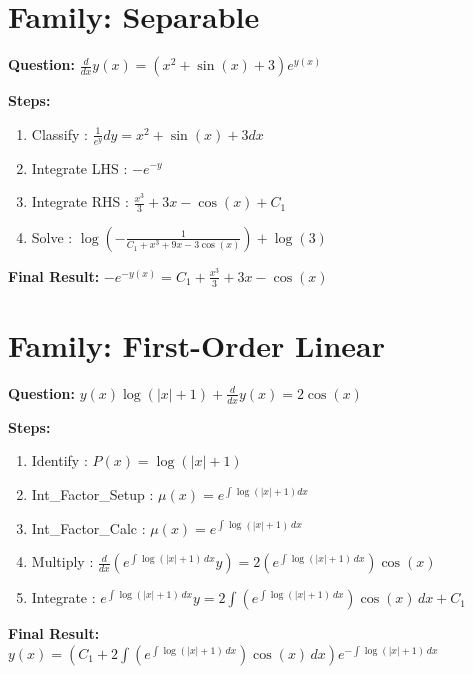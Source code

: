 \documentclass{article}
\begin{document}
\section*{Family: Separable}
\textbf{Question:} $\frac{d}{d x} y{\left(x \right)} = \left(x^{2} + \sin{\left(x \right)} + 3\right) e^{y{\left(x \right)}}$

\textbf{Steps:}
\begin{enumerate}
\item Classify :  $\frac{1}{e^{y}} dy = x^{2} + \sin{\left(x \right)} + 3 dx$
\item Integrate LHS :  $- e^{- y}$
\item Integrate RHS :  $\frac{x^{3}}{3} + 3 x - \cos{\left(x \right)} + C_1$
\item Solve :  $\log{\left(- \frac{1}{C_{1} + x^{3} + 9 x - 3 \cos{\left(x \right)}} \right)} + \log{\left(3 \right)}$
\end{enumerate}
\textbf{Final Result:} $- e^{- y{\left(x \right)}} = C_{1} + \frac{x^{3}}{3} + 3 x - \cos{\left(x \right)}$

\section*{Family: First-Order Linear}
\textbf{Question:} $y{\left(x \right)} \log{\left(\left|{x}\right| + 1 \right)} + \frac{d}{d x} y{\left(x \right)} = 2 \cos{\left(x \right)}$

\textbf{Steps:}
\begin{enumerate}
\item Identify :  $P(x) = \log{\left(\left|{x}\right| + 1 \right)}$
\item Int_Factor_Setup :  $\mu(x) = e^{\int \log{\left(\left|{x}\right| + 1 \right)} dx}$
\item Int_Factor_Calc :  $\mu(x) = e^{\int \log{\left(\left|{x}\right| + 1 \right)}\, dx}$
\item Multiply :  $\frac{d}{dx}(e^{\int \log{\left(\left|{x}\right| + 1 \right)}\, dx}y) = 2 \left(e^{\int \log{\left(\left|{x}\right| + 1 \right)}\, dx}\right) \cos{\left(x \right)}$
\item Integrate :  $e^{\int \log{\left(\left|{x}\right| + 1 \right)}\, dx}y = 2 \int \left(e^{\int \log{\left(\left|{x}\right| + 1 \right)}\, dx}\right) \cos{\left(x \right)}\, dx + C_1$
\end{enumerate}
\textbf{Final Result:} $y{\left(x \right)} = \left(C_{1} + 2 \int \left(e^{\int \log{\left(\left|{x}\right| + 1 \right)}\, dx}\right) \cos{\left(x \right)}\, dx\right) e^{- \int \log{\left(\left|{x}\right| + 1 \right)}\, dx}$
\end{document}
